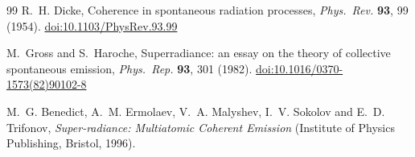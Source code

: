 \documentclass[12pt,a4paper]{article}
\begin{document}
\begin{thebibliography}{99}
R.~H. Dicke, Coherence in spontaneous radiation processes,
\emph{Phys.\ Rev.} \textbf{93}, 99 (1954).
\href{https://doi.org/10.1103/PhysRev.93.99}{doi:10.1103/PhysRev.93.99}

M.~Gross and S.~Haroche, Superradiance: an essay on the theory of collective
spontaneous emission, \emph{Phys.\ Rep.} \textbf{93}, 301 (1982).
\href{https://doi.org/10.1016/0370-1573(82)90102-8}{doi:10.1016/0370-1573(82)90102-8}

M.~G. Benedict, A.~M. Ermolaev, V.~A. Malyshev, I.~V. Sokolov and
E.~D. Trifonov, \emph{Super-radiance: Multiatomic Coherent Emission}
(Institute of Physics Publishing, Bristol, 1996).

\end{thebibliography}

\DocFooter
\end{document}
